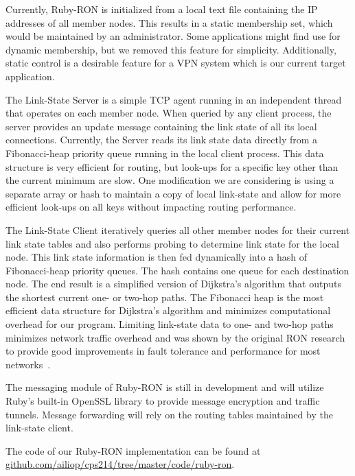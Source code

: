 Currently, Ruby-RON is initialized from a local text file containing the IP
addresses of all member nodes.  This results in a static membership set,
which would be maintained by an administrator.  Some applications might
find use for dynamic membership, but we removed this feature for
simplicity.  Additionally, static control is a desirable feature for a VPN
system which is our current target application.

The Link-State Server is a simple TCP agent running in an independent
thread that operates on each member node.  When queried by any client
process, the server provides an update message containing the link state of
all its local connections.  Currently, the Server reads its link state data
directly from a Fibonacci-heap priority queue running in the local client
process.  This data structure is very efficient for routing, but look-ups
for a specific key other than the current minimum are slow.  One
modification we are considering is using a separate array or hash to
maintain a copy of local link-state and allow for more efficient look-ups
on all keys without impacting routing performance.

The Link-State Client iteratively queries all other member nodes for their
current link state tables and also performs probing to determine link state
for the local node.  This link state information is then fed dynamically
into a hash of Fibonacci-heap priority queues.  The hash contains one queue
for each destination node.  The end result is a simplified version of
Dijkstra's algorithm that outputs the shortest current one- or two-hop
paths.  The Fibonacci heap is the most efficient data structure for
Dijkstra's algorithm and minimizes computational overhead for our program.
Limiting link-state data to one- and two-hop paths minimizes network
traffic overhead and was shown by the original RON research to provide good
improvements in fault tolerance and performance for most
networks~\cite{Andersen_2001}.

The messaging module of Ruby-RON is still in development and will utilize
Ruby's built-in OpenSSL library to provide message encryption and traffic
tunnels.  Message forwarding will rely on the routing tables maintained by
the link-state client.

The code of our Ruby-RON implementation can be found at
\url{github.com/ailiop/cps214/tree/master/code/ruby-ron}.



